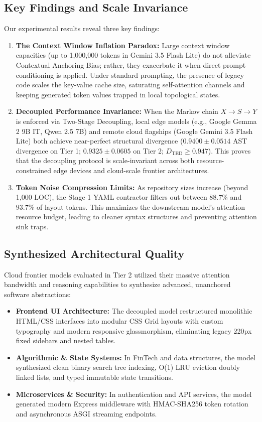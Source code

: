 \documentclass[10pt,journal,compsoc]{IEEEtran}
\begin{document}
\subsection{Key Findings and Scale Invariance}
Our experimental results reveal three key findings:
\begin{enumerate}
    \item \textbf{The Context Window Inflation Paradox:} Large context window capacities (up to 1,000,000 tokens in Gemini 3.5 Flash Lite) do not alleviate Contextual Anchoring Bias; rather, they exacerbate it when direct prompt conditioning is applied. Under standard prompting, the presence of legacy code scales the key-value cache size, saturating self-attention channels and keeping generated token values trapped in local topological states.
    \item \textbf{Decoupled Performance Invariance:} When the Markov chain $X \to S \to Y$ is enforced via Two-Stage Decoupling, local edge models (e.g., Google Gemma 2 9B IT, Qwen 2.5 7B) and remote cloud flagships (Google Gemini 3.5 Flash Lite) both achieve near-perfect structural divergence ($0.9400 \pm 0.0514$ AST divergence on Tier 1; $0.9325 \pm 0.0605$ on Tier 2; $D_{\text{TED}} \ge 0.947$). This proves that the decoupling protocol is scale-invariant across both resource-constrained edge devices and cloud-scale frontier architectures.
    \item \textbf{Token Noise Compression Limits:} As repository sizes increase (beyond 1,000 LOC), the Stage 1 YAML contractor filters out between $88.7\%$ and $93.7\%$ of layout tokens. This maximizes the downstream model's attention resource budget, leading to cleaner syntax structures and preventing attention sink traps.
\end{enumerate}

\subsection{Synthesized Architectural Quality}
Cloud frontier models evaluated in Tier 2 utilized their massive attention bandwidth and reasoning capabilities to synthesize advanced, unanchored software abstractions:
\begin{itemize}
    \item \textbf{Frontend UI Architecture:} The decoupled model restructured monolithic HTML/CSS interfaces into modular CSS Grid layouts with custom typography and modern responsive glassmorphism, eliminating legacy 220px fixed sidebars and nested tables.
    \item \textbf{Algorithmic \& State Systems:} In FinTech and data structures, the model synthesized clean binary search tree indexing, O(1) LRU eviction doubly linked lists, and typed immutable state transitions.
    \item \textbf{Microservices \& Security:} In authentication and API services, the model generated modern Express middleware with HMAC-SHA256 token rotation and asynchronous ASGI streaming endpoints.
\end{itemize}
\end{document}
